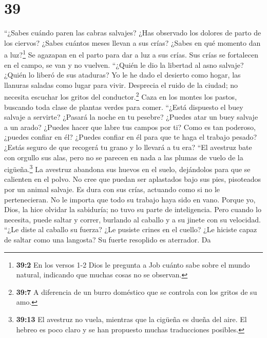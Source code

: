 \hypertarget{section-38}{%
\section{39}\label{section-38}}

 ``¿Sabes cuándo paren las cabras salvajes? ¿Has observado
los dolores de parto de los ciervos?  ¿Sabes cuántos meses
llevan a sus crías? ¿Sabes en qué momento dan a luz?\footnote{\textbf{39:2}
  En los versos 1-2 Dios le pregunta a Job cuánto sabe sobre el mundo
  natural, indicando que muchas cosas no se observan.}  Se
agazapan en el parto para dar a luz a sus crías.  Sus
crías se fortalecen en el campo, se van y no vuelven. 
``¿Quién le dio la libertad al asno salvaje? ¿Quién lo liberó de sus
ataduras?  Yo le he dado el desierto como hogar, las
llanuras saladas como lugar para vivir.  Desprecia el
ruido de la ciudad; no necesita escuchar los gritos del
conductor.\footnote{\textbf{39:7} A diferencia de un burro doméstico que
  se controla con los gritos de su amo.}  Caza en los
montes los pastos, buscando toda clase de plantas verdes para comer.
 ``¿Está dispuesto el buey salvaje a servirte? ¿Pasará la
noche en tu pesebre?  ¿Puedes atar un buey salvaje a un
arado? ¿Puedes hacer que labre tus campos por ti?  Como
es tan poderoso, ¿puedes confiar en él? ¿Puedes confiar en él para que
te haga el trabajo pesado?  ¿Estás seguro de que recogerá
tu grano y lo llevará a tu era?  ``El avestruz bate con
orgullo sus alas, pero no se parecen en nada a las plumas de vuelo de la
cigüeña.\footnote{\textbf{39:13} El avestruz no vuela, mientras que la
  cigüeña es dueña del aire. El hebreo es poco claro y se han propuesto
  muchas traducciones posibles.}  La avestruz abandona
sus huevos en el suelo, dejándolos para que se calienten en el polvo.
 No cree que puedan ser aplastados bajo sus pies,
pisoteados por un animal salvaje.  Es dura con sus crías,
actuando como si no le pertenecieran. No le importa que todo su trabajo
haya sido en vano.  Porque yo, Dios, la hice olvidar la
sabiduría; no tuvo su parte de inteligencia.  Pero cuando
lo necesita, puede saltar y correr, burlando al caballo y a su jinete
con su velocidad.  ``¿Le diste al caballo su fuerza? ¿Le
pusiste crines en el cuello?  ¿Le hiciste capaz de saltar
como una langosta? Su fuerte resoplido es aterrador.  Da
